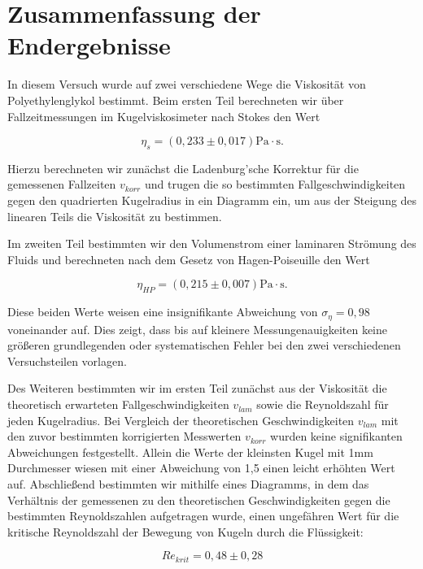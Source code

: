 \documentclass{article}
\begin{document}
\newpage
\section{Zusammenfassung der Endergebnisse}

In diesem Versuch wurde auf zwei verschiedene Wege die Viskosität von Polyethylenglykol bestimmt. Beim ersten Teil berechneten wir über Fallzeitmessungen im Kugelviskosimeter nach Stokes den Wert

\begin{equation}
    \eta_s = (0,233 \pm 0,017) \text{Pa} \cdot \text{s}.
\end{equation}

Hierzu berechneten wir zunächst die Ladenburg'sche Korrektur für die gemessenen Fallzeiten $v_{korr}$ und trugen die so bestimmten Fallgeschwindigkeiten gegen den quadrierten Kugelradius in ein Diagramm ein, um aus der Steigung des linearen Teils die Viskosität zu bestimmen. 

Im zweiten Teil bestimmten wir den Volumenstrom einer laminaren Strömung des Fluids und berechneten nach dem Gesetz von Hagen-Poiseuille den Wert

\begin{equation}
    \eta_{HP} = (0,215 \pm 0,007) \text{Pa} \cdot \text{s}.
\end{equation}

Diese beiden Werte weisen eine insignifikante Abweichung von $\sigma_{\eta} = 0,98$ voneinander auf. Dies zeigt, dass bis auf kleinere Messungenauigkeiten keine größeren grundlegenden oder systematischen Fehler bei den zwei verschiedenen Versuchsteilen vorlagen.

Des Weiteren bestimmten wir im ersten Teil zunächst aus der Viskosität die theoretisch erwarteten Fallgeschwindigkeiten $v_{lam}$ sowie die Reynoldszahl für jeden Kugelradius. Bei Vergleich der theoretischen Geschwindigkeiten $v_{lam}$ mit den zuvor bestimmten korrigierten Messwerten $v_{korr}$ wurden keine signifikanten Abweichungen festgestellt. Allein die Werte der kleinsten Kugel mit 1mm Durchmesser wiesen mit einer Abweichung von 1,5 einen leicht erhöhten Wert auf. Abschließend bestimmten wir mithilfe eines Diagramms, in dem das Verhältnis der gemessenen zu den theoretischen Geschwindigkeiten gegen die bestimmten Reynoldszahlen aufgetragen wurde, einen ungefähren Wert für die kritische Reynoldszahl der Bewegung von Kugeln durch die Flüssigkeit: 

\begin{equation}
    Re_{krit} = 0,48 \pm 0,28
\end{equation}
\end{document}
